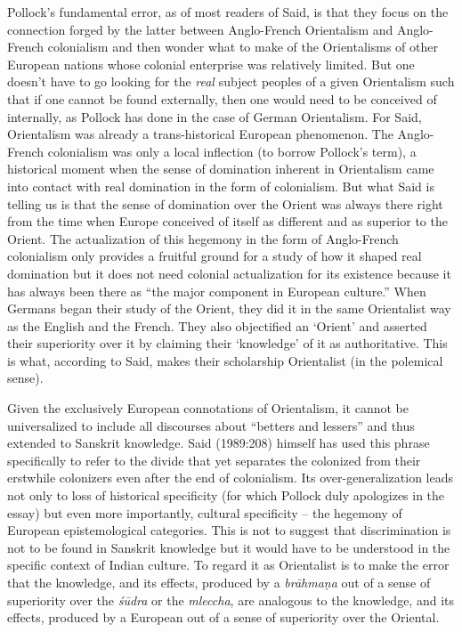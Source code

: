 Pollock’s fundamental error, as of most readers of Said, is that they focus on the connection forged by the latter between Anglo-French Orientalism and Anglo-French colonialism and then wonder what to make of the Orientalisms of other European nations whose colonial enterprise was relatively limited. But one doesn’t have to go looking for the {\sl real} subject peoples of a given Orientalism such that if one cannot be found externally, then one would need to be conceived of internally, as Pollock has done in the case of German Orientalism. For Said, Orientalism was already a trans-historical European phenomenon. The Anglo-French colonialism was only a local inflection (to borrow Pollock’s term), a historical moment when the sense of domination inherent in Orientalism came into contact with real domination in the form of colonialism. But what Said is telling us is that the sense of domination over the Orient was always there right from the time when Europe conceived of itself as different and as superior to the Orient. The actualization of this hegemony in the form of Anglo-French colonialism only provides a fruitful ground for a study of how it shaped real domination but it does not need colonial actualization for its existence because it has always been there as “the major component in European culture.” When Germans began their study of the Orient, they did it in the same Orientalist way as the English and the French. They also objectified an ‘Orient’ and asserted their superiority over it by claiming their ‘knowledge’ of it as authoritative. This is what, according to Said, makes their scholarship Orientalist (in the polemical sense).


Given the exclusively European connotations of Orientalism, it cannot be universalized to include all discourses about “betters and lessers” and thus extended to Sanskrit knowledge. Said (1989:208) himself has used this phrase specifically to refer to the divide that yet separates the colonized from their erstwhile colonizers even after the end of colonialism. Its over-generalization leads not only to loss of historical specificity (for which Pollock duly apologizes in the essay) but even more importantly, cultural specificity – the hegemony of European epistemological categories. This is not to suggest that discrimination is not to be found in Sanskrit knowledge but it would have to be understood in the specific context of Indian culture. To regard it as Orientalist is to make the error that the knowledge, and its effects, produced by a {\sl brāhmaṇa} out of a sense of superiority over the {\sl śūdra} or the {\sl mleccha}, are analogous to the knowledge, and its effects, produced by a European out of a sense of superiority over the Oriental.

